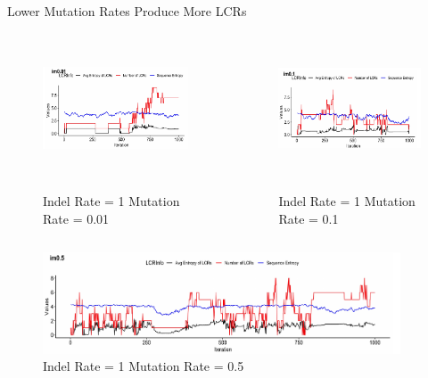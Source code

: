 \documentclass{beamer}
\begin{document}
	\begin{frame}{Lower Mutation Rates Produce More LCRs}
		\begin{columns}	
			\centering
			\begin{figure}
				\includegraphics[height=3cm, width=6cm]{ind_figures/im0.01} \\~\\
				\vspace{-0.5cm}\tiny\caption{\centering Indel Rate = 1 Mutation Rate = 0.01}
			\end{figure} \pause
			
			\centering
			\begin{figure}
				\includegraphics[height=3cm, width=6cm]{ind_figures/im0.1} \\~\\
				\vspace{-0.5cm}\tiny\caption{\centering Indel Rate = 1 Mutation Rate = 0.1}
			\end{figure} \pause
			
		\end{columns}
		
		\begin{figure}
			\includegraphics[height=3cm, width=\textwidth]{ind_figures/im0.5}
			\vspace{-0.7cm}\caption{\centering Indel Rate = 1 Mutation Rate = 0.5}
		\end{figure}
	\end{frame}
\end{document}
